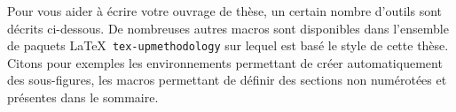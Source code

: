 \documentclass[french]{spimubephdthesis}
\begin{document}
%
%
%
%
%
%

\chapterintro

Pour vous aider à écrire votre ouvrage de thèse, un certain nombre d'outils sont décrits ci-dessous.
De nombreuses autres macros sont disponibles dans l'ensemble de paquets \LaTeX\ \texttt{tex-upmethodology}
sur lequel est basé le style de cette thèse. Citons pour exemples les environnements permettant de créer
automatiquement des sous-figures, les macros permettant de définir des sections non numérotées et présentes
dans le sommaire.
\end{document}
